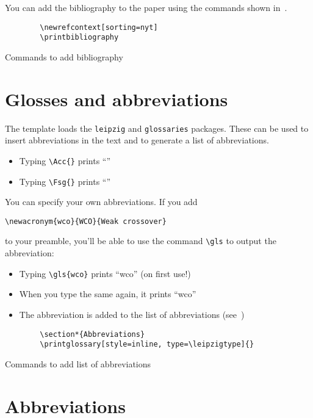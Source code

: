 You can add the bibliography to the paper using the commands shown in~.

\begin{listing}[H]
    \begin{verbatim}
        \newrefcontext[sorting=nyt]
        \printbibliography
    \end{verbatim}
    \caption{Commands to add bibliography}\label{lst:bibliography}
\end{listing}

\section{Glosses and abbreviations}

The template loads the \texttt{leipzig} and \texttt{glossaries} packages. These can
be used to insert abbreviations in the text and to generate a list of abbreviations.

\begin{itemize}
    \item Typing \verb+\Acc{}+ prints \enquote{\Acc}
    \item Typing \verb+\Fsg{}+ prints \enquote{\Fsg}
\end{itemize}

You can specify your own abbreviations. If you add

\begin{verbatim}
\newacronym{wco}{WCO}{Weak crossover}
\end{verbatim}

to your preamble, you'll be able to use the command \verb+\gls+ to output the
abbreviation:

\begin{itemize}
    \item Typing \verb+\gls{wco}+ prints \enquote{\gls{wco}} (on first use!)
    \item When you type the same again, it prints \enquote{\gls{wco}}
    \item The abbreviation is added to the list of abbreviations
    (see~)
\end{itemize}

\begin{listing}[H]
    \begin{verbatim}
        \section*{Abbreviations}
        \printglossary[style=inline, type=\leipzigtype]{}
    \end{verbatim}
    \caption{Commands to add list of abbreviations}\label{lst:abbreviations}
\end{listing}

\section*{Abbreviations}
\printglossary[style=inline, type=\leipzigtype]{}

\newrefcontext[sorting=nyt]
\printbibliography

%


